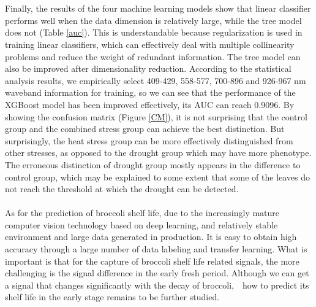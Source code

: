 \documentclass[12pt,a4paper]{article}
\begin{document}
\\
\\
Finally, the results of the four machine learning models show that linear classifier performs well when the data dimension is relatively large, while the tree model does not (Table \ref{auc}). This is understandable because regularization is used in training linear classifiers, which can effectively deal with multiple collinearity problems and reduce the weight of redundant information. The tree model can also be improved after dimensionality reduction. According to the statistical analysis results, we empirically select 409-429, 558-577, 700-896 and 926-967 nm waveband information for training, so we can see that the performance of the XGBoost model has been improved effectively, its AUC can reach 0.9096. By showing the confusion matrix (Figure \ref{CM}), it is not surprising that the control group and the combined stress group can achieve the best distinction. But surprisingly, the heat stress group can be more effectively distinguished from other stresses, as opposed to the drought group which may have more phenotype. The erroneous distinction of drought group mostly appears in the difference to control group, which may be explained to some extent that some of the leaves do not reach the threshold at which the drought can be detected.
\\
\\
As for the prediction of broccoli shelf life, due to the increasingly mature computer vision technology based on deep learning, and relatively stable environment and large data generated in production. It is easy to obtain high accuracy through a large number of data labeling and transfer learning. What is important is that for the capture of broccoli shelf life related signals, the more challenging is the signal difference in the early fresh period. Although we can get a signal that changes significantly with the decay of broccoli,　how to predict its shelf life in the early stage remains to be further studied.
\end{document}
